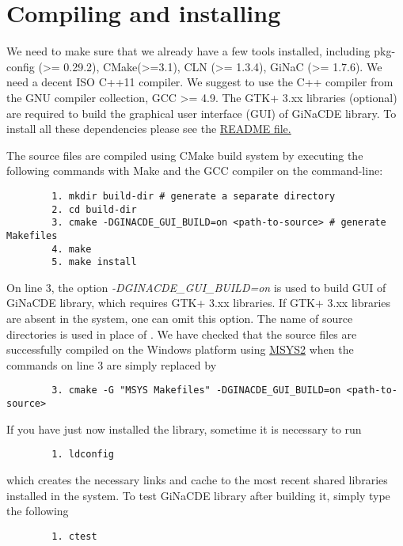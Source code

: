 \documentclass[prd,aps,floats,showkeys,nofootinbib,notitlepage]{revtex4-2}
\begin{document}
	
		
	
	\section{Compiling and installing}\label{sec:compile}
	We need to make sure that we already have a few tools installed, including pkg-config (>= 0.29.2), CMake(>=3.1), CLN (>= 1.3.4), GiNaC (>= 1.7.6). We need a decent ISO C++11 compiler. We suggest to use the C++ compiler from the GNU compiler collection, GCC >= 4.9. The GTK+ 3.xx libraries (optional) are required to build the graphical user interface (GUI) of GiNaCDE library. To install all these dependencies please see the \href{https://github.com/mithun218/GiNaCDE/tree/master#readme}{README file.} 
	
	The source files are compiled using CMake build system by executing the following commands with Make and the GCC compiler on the command-line:
	\begin{verbatim}
		1. mkdir build-dir # generate a separate directory
		2. cd build-dir
		3. cmake -DGINACDE_GUI_BUILD=on <path-to-source> # generate Makefiles
		4. make
		5. make install
	\end{verbatim}
	On line 3, the option {\em -DGINACDE\_GUI\_BUILD=on} is used to build GUI of GiNaCDE library, which requires GTK+ 3.xx libraries. If GTK+ 3.xx libraries are absent in the system, one can omit this option. The name of source directories is used in place of {\em <path-to-source>}. We have checked that the source files are successfully compiled on the Windows platform using \href{https://www.msys2.org}{MSYS2} when the commands on line 3 are simply replaced by
	\begin{verbatim}
		3. cmake -G "MSYS Makefiles" -DGINACDE_GUI_BUILD=on <path-to-source>
	\end{verbatim}
	If you have just now installed the library, sometime it is necessary to run
	\begin{verbatim}
		1. ldconfig
	\end{verbatim}
	which creates the necessary links and cache to the most recent shared libraries installed in the system.
	To test GiNaCDE library after building it, simply type the following
	\begin{verbatim}
		1. ctest
	\end{verbatim}
	
\end{document}
